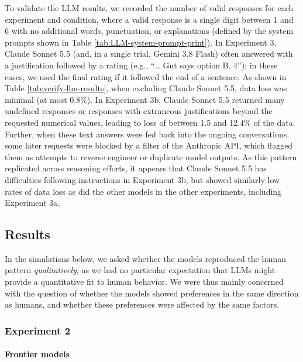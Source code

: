 \documentclass[
]{article}
\begin{document}
To validate the LLM results, we recorded the number of valid responses for each experiment and condition, where a valid response is a single digit between 1 and 6 with no additional words, punctuation, or explanations (defined by the system prompts shown in Table \ref{tab:LLM-system-prompt-print}). In Experiment 3, Claude Sonnet 5.5 (and, in a single trial, Gemini 3.8 Flash) often answered with a justification followed by a rating (e.g., ``\ldots{} Gut says option B. 4''); in these cases, we used the final rating if it followed the end of a sentence. As shown in Table \ref{tab:verify-llm-results}, when excluding Claude Sonnet 5.5, data loss was minimal (at most 0.8\%). In Experiment 3b, Claude Sonnet 5.5 returned many undefined responses or responses with extraneous justifications beyond the requested numerical values, leading to loss of between 1.5 and 12.4\% of the data. Further, when these text answers were fed back into the ongoing conversations, some later requests were blocked by a filter of the Anthropic API, which flagged them as attempts to reverse engineer or duplicate model outputs. As this pattern replicated across reasoning efforts, it appears that Claude Sonnet 5.5 has difficulties following instructions in Experiment 3b, but showed similarly low rates of data loss as did the other models in the other experiments, including Experiment 3a.

\clearpage

\subsection{Results}\label{results-1}

In the simulations below, we asked whether the models reproduced the human pattern \emph{qualitatively}, as we had no particular expectation that LLMs might provide a quantitative fit to human behavior. We were thus mainly concerned with the question of whether the models showed preferences in the same direction as humans, and whether these preferences were affected by the same factors.

\subsubsection{Experiment 2}\label{experiment-2}

\paragraph{Frontier models}\label{frontier-models}
\end{document}
